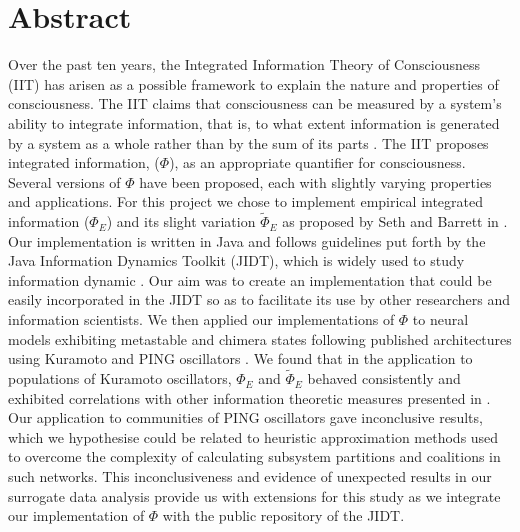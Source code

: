 \documentclass[a4paper,11pt]{article}
\begin{document}
\null
\clearpage

\section{Abstract}
\label{sec:abstract}
Over the past ten years, the Integrated Information Theory of Consciousness (IIT) has arisen as a possible framework to explain the nature and properties of consciousness. The IIT claims that consciousness can be measured by a system's ability to integrate information, that is, to what extent information is generated by a system as a whole rather  than by the sum of its parts \cite{Tononi2003}. The IIT proposes integrated information, ($\Phi$), as an appropriate quantifier for consciousness. Several versions of $\Phi$ have been proposed, each with slightly varying properties and applications. For this project we chose to implement empirical integrated information ($\Phi_E$) and its slight variation $\widetilde{\Phi}_E$ as proposed by Seth and Barrett in \cite{Barrett2011}. Our implementation is written in Java and follows guidelines put forth by the Java Information Dynamics Toolkit (JIDT), which is widely used to study information dynamic \cite{Lizier2014}. Our aim was to create an implementation that could be easily incorporated in the JIDT so as to facilitate its use by other researchers and information scientists. We then applied our implementations of $\Phi$ to neural models exhibiting metastable and chimera states following published architectures using Kuramoto \cite{Shanahan2010} and PING oscillators \cite{Bhowmik2013}. We found that in the application to populations of Kuramoto oscillators, $\Phi_E$ and $\widetilde{\Phi}_E$ behaved consistently and exhibited correlations with other information theoretic measures presented in \cite{Shanahan2010}. Our application to communities of PING oscillators gave inconclusive results, which we hypothesise could be related to heuristic approximation methods used to overcome the complexity of calculating subsystem partitions and coalitions in such networks. This inconclusiveness and evidence of unexpected results in our surrogate data analysis provide us with extensions for this study as we integrate our implementation of $\Phi$ with the public repository of the JIDT. 
\end{document}
